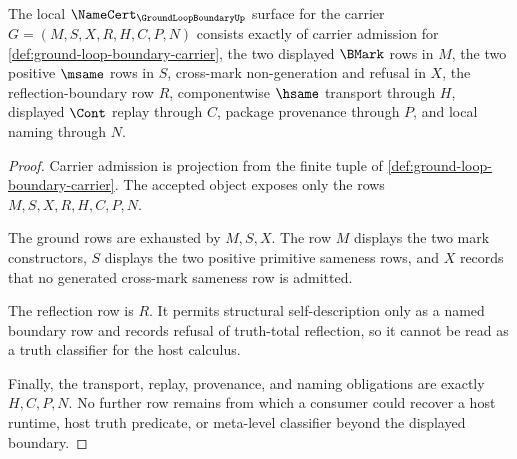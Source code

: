 \begin{theorem}
\label{thm:ground-loop-boundary-namecert-obligations}
The local $\NameCert_{\GroundLoopBoundaryUp}$ surface for the carrier $G=(M,S,X,R,H,C,P,N)$ consists exactly of carrier admission for \autoref{def:ground-loop-boundary-carrier}, the two displayed $\BMark$ rows in $M$, the two positive $\msame$ rows in $S$, cross-mark non-generation and refusal in $X$, the reflection-boundary row $R$, componentwise $\hsame$ transport through $H$, displayed $\Cont$ replay through $C$, package provenance through $P$, and local naming through $N$.
\end{theorem}
\begin{proof}
Carrier admission is projection from the finite tuple of \autoref{def:ground-loop-boundary-carrier}. The accepted object exposes only the rows $M,S,X,R,H,C,P,N$.

The ground rows are exhausted by $M,S,X$. The row $M$ displays the two mark constructors, $S$ displays the two positive primitive sameness rows, and $X$ records that no generated cross-mark sameness row is admitted.

The reflection row is $R$. It permits structural self-description only as a named boundary row and records refusal of truth-total reflection, so it cannot be read as a truth classifier for the host calculus.

Finally, the transport, replay, provenance, and naming obligations are exactly $H,C,P,N$. No further row remains from which a consumer could recover a host runtime, host truth predicate, or meta-level classifier beyond the displayed boundary.
\end{proof}

